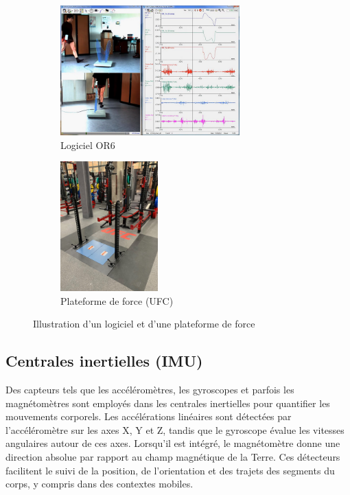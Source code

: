 \begin{figure}[ht]
  \centering
  \begin{subfigure}[b]{0.45\textwidth}
    \centering
    \includegraphics[height=5cm]{images/OR6.png}
    \caption{Logiciel OR6}\label{fig:OR6}
  \end{subfigure}
  \begin{subfigure}[b]{0.45\textwidth}
    \centering
    \includegraphics[height=5cm]{images/AMTI.jpeg}
    \caption{Plateforme de force (UFC)}\label{fig:AMTI}
  \end{subfigure}
  \caption{Illustration d'un logiciel et d'une plateforme de force}\label{fig:exemple_plateforme_force}
\end{figure}


\subsection{Centrales inertielles (IMU)}

Des capteurs tels que les accéléromètres, les gyroscopes et parfois les magnétomètres sont employés dans les centrales inertielles pour quantifier les mouvements corporels. 
Les accélérations linéaires sont détectées par l'accéléromètre sur les axes X, Y et Z, tandis que le gyroscope évalue les vitesses angulaires autour de ces axes. 
Lorsqu'il est intégré, le magnétomètre donne une direction absolue par rapport au champ magnétique de la Terre. 
Ces détecteurs facilitent le suivi de la position, de l'orientation et des trajets des segments du corps, y compris dans des contextes mobiles.

